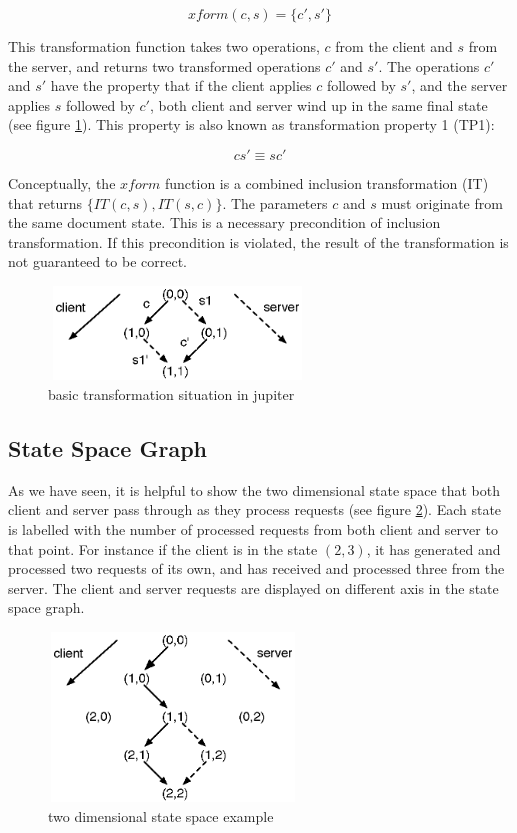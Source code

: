 $$ xform(c,s)=\{c',s'\} $$

This transformation function takes two operations, $c$ from the client and $s$ from the server, and returns two transformed operations $c'$ and $s'$. The operations $c'$ and $s'$ have the property that if the client applies $c$ followed by $s'$, and the server applies $s$ followed by $c'$, both client and server wind up in the same final state (see figure \ref{fig:concepts.basic}). This property is also known as transformation property 1 (TP1):

$$ c s' \equiv s c' $$

Conceptually, the $xform$ function is a combined inclusion transformation (IT) that returns $\{IT(c,s),IT(s,c)\}$. The parameters $c$ and $s$ must originate from the same document state. This is a necessary precondition of inclusion transformation. If this precondition is violated, the result of the transformation is not guaranteed to be correct.

\begin{figure}[htb]
 \centering
 \includegraphics[width=6.85cm,height=2.5cm]{../../images/concepts_jupiter1.eps}
 \caption{basic transformation situation in jupiter}
 \label{fig:concepts.basic}
\end{figure}


\subsection{State Space Graph}
As we have seen, it is helpful to show the two dimensional state space that both client and server pass through as they process requests (see figure \ref{fig:concepts.statespace}). Each state is labelled with the number of processed requests from both client and server to that point. For instance if the client is in the state $(2,3)$, it has generated and processed two requests of its own, and has received and processed three from the server. The client and server requests are displayed on different axis in the state space graph.

\begin{figure}[htb]
 \centering
 \includegraphics[width=6.63cm,height=4.5cm]{../../images/concepts_statespace.eps}
 \caption{two dimensional state space example}
 \label{fig:concepts.statespace}
\end{figure}

